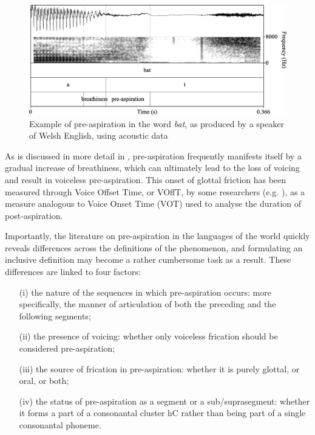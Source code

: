 \documentclass[output=paper]{langscibook}
\begin{document}
\begin{figure}
\includegraphics[width=\textwidth]{figures/Hejna-img001.png}
\caption{\label{fig:hejna:1}Example of pre\hyp aspiration in the word \textit{bat}, as produced by a speaker of Welsh English, using acoustic data}
\end{figure}

As is discussed in more detail in , pre\hyp aspiration frequently manifests itself by a gradual increase of breathiness, which can ultimately lead to the loss of voicing and result in voiceless pre-aspiration. This onset of glottal friction has been measured through Voice Offset Time, or VOffT, by some researchers (e.g. \citealt{Pind1998}), as a measure analogous to Voice Onset Time (VOT) used to analyse the duration of post-aspiration.

Importantly, the literature on pre\hyp aspiration in the languages of the world quickly reveals differences across the definitions of the phenomenon, and formulating an inclusive definition may become a rather cumbersome task as a result. These differences are linked to four factors:

\begin{itemize}
\item[(i)] the nature of the sequences in which pre\hyp aspiration occurs: more specifically, the manner of articulation of both the preceding and the following segments;
\item[(ii)] the presence of voicing: whether only voiceless frication should be considered pre-aspiration;
\item[(iii)] the source of frication in pre-aspiration: whether it is purely glottal, or oral, or both;
\item[(iv)] the status of pre\hyp aspiration as a segment or a sub\slash suprasegment: whether it forms a part of a consonantal cluster hC rather than being part of a single consonantal phoneme.
\end{itemize}
\end{document}
